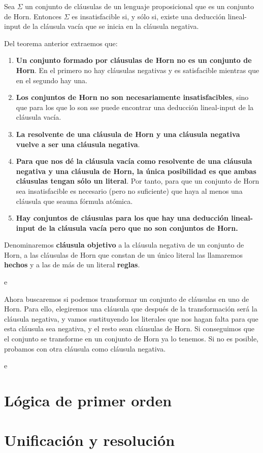 \begin{nth}
    Sea $\Sigma$ un conjunto de cláusulas de un lenguaje proposicional que es un conjunto de Horn. Entonces $\Sigma$ es insatisfacible si, y sólo si, existe una deducción lineal-input de la cláusula vacía que se inicia en la cláusula negativa.
\end{nth}
\begin{obs} Del teorema anterior extraemos que:
    \begin{enumerate}
        \item \textbf{Un conjunto formado por cláusulas de Horn no es un conjunto de Horn}. En el primero no hay cláusulas negativas y es satisfacible mientras que en el segundo hay una.
        \item \textbf{Los conjuntos de Horn no son necesariamente insatisfacibles}, sino que para los que lo son sse puede encontrar una deducción lineal-input de la cláusula vacía.
        \item \textbf{La resolvente de una cláusula de Horn y una cláusula negativa vuelve a ser una cláusula negativa}.
        \item \textbf{Para que nos dé la cláusula vacía como resolvente de una cláusula negativa y una cláusula de Horn, la única posibilidad es que ambas cláusulas tengan sólo un literal}. Por tanto, para que un conjunto de Horn sea insatisfacible es necesario (pero no suficiente) que haya al menos una cláusula que seauna fórmula atómica.
        \item \textbf{Hay conjuntos de cláusulas para los que hay una deducción lineal-input de la cláusula vacía pero que no son conjuntos de Horn.}
    \end{enumerate}
\end{obs}
Denominaremos \textbf{cláusula objetivo} a la cláusula negativa de un conjunto de Horn, a las cláusulas de Horn que constan de un único literal las llamaremos \textbf{hechos} y a las de más de un literal \textbf{reglas}.
\begin{ejemplo}
    e
\end{ejemplo}

Ahora buscaremos si podemos transformar un conjunto de cláusulas en uno de Horn. Para ello, elegiremos una cláusula que después de la transformación será la cláusula negativa, y vamos sustituyendo los literales que nos hagan falta para que esta cláusula sea negativa, y el resto sean cláusulas de Horn. Si conseguimos que el conjunto se transforme en un conjunto de Horn ya lo tenemos. Si no es posible, probamos con otra cláusula como cláusula negativa.
\begin{ejemplo}
    e
\end{ejemplo}

\newpage
\section{Lógica de primer orden}


\newpage
\section{Unificación y resolución}